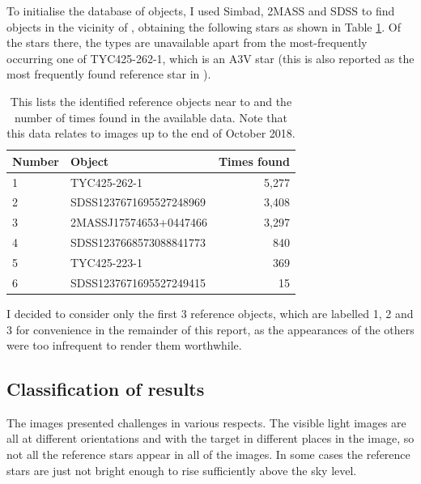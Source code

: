 To initialise the database of objects, I used Simbad, 2MASS and SDSS to find objects in the vicinity of \bstar, obtaining the following stars as shown in Table
\ref{table:reftimesfound}. Of the stars there, the types are unavailable apart from the most-frequently occurring one of
TYC425-262-1, which is an A3V star (this is also reported as the most frequently found reference star in \citet{berry11}).

\begin{table}[!htbp]
\begin{center}
\begin{tabular}{llr} \hline
Number & Object & Times found \\\hline
1 & TYC425-262-1 & 5,277 \\
2 & SDSS1237671695527248969 & 3,408 \\
3 & 2MASSJ17574653+0447466 & 3,297 \\
4 & SDSS1237668573088841773 & 840 \\
5 & TYC425-223-1 & 369 \\
6 & SDSS1237671695527249415 & 15 \\
\hline
\end{tabular}
\end{center}
\caption{This lists the identified reference objects near to {\bstar} and the number of times found in the available
  data. Note that this data relates to images up to the end of October 2018.}
\protect\label{table:reftimesfound}
\end{table}

I decided to consider only the first 3 reference objects, which are labelled 1, 2 and 3 for convenience in the
remainder of this report, as the appearances of the others were too infrequent to render them worthwhile.

\subsection{Classification of results}
\protect\label{section:classresults}

The images presented challenges in various respects. The visible light images are all at different orientations and with
the target in different places in the image, so not all the reference stars appear in all of the images. In some cases
the reference stars are just not bright enough to rise sufficiently above the sky level.

